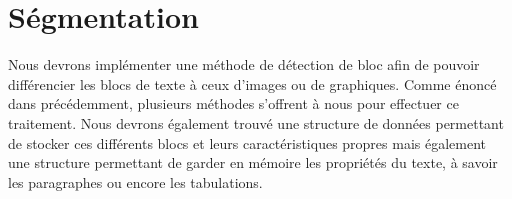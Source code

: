 \documentclass[]{report}
\begin{document}

    \section{S\'egmentation} %
    \label{sec:s\'egmentation}
  		Nous devrons implémenter une méthode de détection de bloc afin de pouvoir différencier les blocs de texte à ceux d'images ou de graphiques. Comme énoncé dans précédemment, plusieurs méthodes s'offrent à nous pour effectuer ce traitement. Nous devrons également trouvé une structure de données permettant de stocker ces différents blocs et leurs caractéristiques propres mais également une structure permettant de garder en mémoire les propriétés du texte, à savoir les paragraphes ou encore les tabulations.







 
\end{document}
